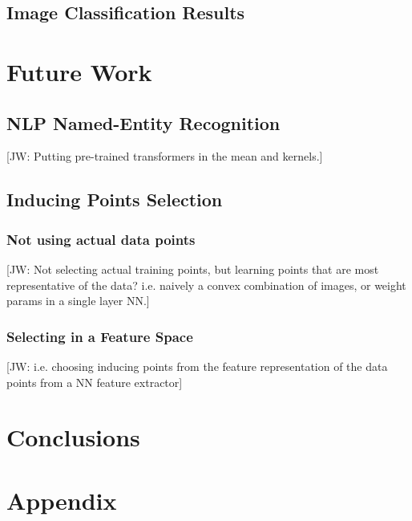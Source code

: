 \documentclass{article}
\newcommand{\jw}[1]{{\color{gray} [JW: #1]}}
\numberwithin{equation}{section}
\begin{document}
\subsection{Image Classification Results}

\newpage
\section{Future Work}
\subsection{NLP Named-Entity Recognition}
\jw{Putting pre-trained transformers in the mean and kernels.} 


\subsection{Inducing Points Selection}
\subsubsection{Not using actual data points}
\jw{Not selecting actual training points, but learning points that are most representative of the data? i.e. naively a convex combination of images, or weight params in a single layer NN.}
\subsubsection{Selecting in a Feature Space}
\jw{i.e. choosing inducing points from the feature representation of the data points from a NN feature extractor}


\newpage
\section{Conclusions}

\newpage



\newpage
\appendix
\section{Appendix}
\end{document}
